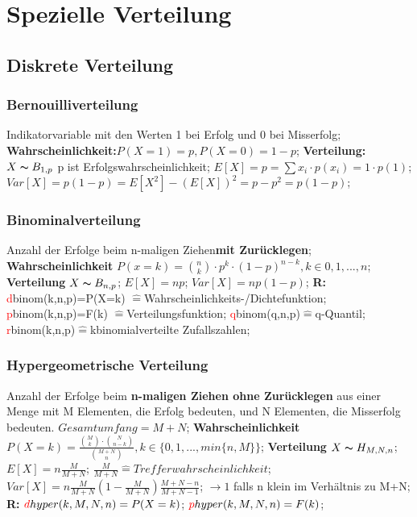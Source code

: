 \section{Spezielle Verteilung}
\subsection{Diskrete Verteilung}
\subsubsection{Bernouilliverteilung}
Indikatorvariable mit den Werten 1 bei Erfolg und 0 bei Misserfolg;
\textbf{Wahrscheinlichkeit:}$P(X=1) = p, P(X=0)  = 1 - p$; 
\textbf{Verteilung:} $X \thicksim B_{1,p}$ p ist Erfolgswahrscheinlichkeit; 
$E[X] = p = \sum x_{i} \cdot p(x_{i}) = 1 \cdot p(1)$; 
$Var[X] = p(1-p)  = E[X^2] -(E[X])^2 = p - p^2 = p(1-p)$; 
\subsubsection{Binominalverteilung}
Anzahl der Erfolge beim n-maligen Ziehen\textbf{mit Zurücklegen};
\textbf{Wahrscheinlichkeit} $ P(x = k ) =  \binom{n}{k} \cdot p^k \cdot (1-p)^{n-k}, k \in {0, 1, ..., n}$; 
\textbf{Verteilung} $ X \thicksim B_{n, p}$; 
$E[X] = np$; 
$ Var[X] = np(1-p) $; 
\textbf{R:}
\textcolor{red}{d}binom(k,n,p)=P(X=k) $\hat{=}$Wahrscheinlichkeits-/Dichtefunktion; 
\textcolor{red}{p}binom(k,n,p)=F(k) $\hat{=}$Verteilungsfunktion; 
\textcolor{red}{q}binom(q,n,p)$\hat{=}$q-Quantil; 
\textcolor{red}{r}binom(k,n,p)$\hat{=}$kbinomialverteilte Zufallszahlen; 
\subsubsection{Hypergeometrische Verteilung}
Anzahl der Erfolge beim \textbf{n-maligen Ziehen ohne Zurücklegen} aus einer Menge mit M Elementen, die Erfolg bedeuten, und N Elementen, die Misserfolg bedeuten. $Gesamtumfang = M + N$;
\textbf{Wahrscheinlichkeit}
$ P(X=k) = \frac{\binom{M}{k} \cdot \binom{N}{n-k}}{\binom{M+N}{n}}, k \in \{0, 1, ..., min\{n,M\}\}$;
\textbf{Verteilung} $ X \thicksim H_{M, N, n}$; $E[X] = n \frac{M}{M+N}$; $\frac{M}{M+N} \hat{=} Trefferwahrscheinlichkeit$; $Var[X] = n \frac{M}{M+N}( 1 - \frac{M}{M+N}) \frac{M+N-n}{M+N-1}$; $\rightarrow 1$ falls n klein im Verhältnis zu M+N;
\textbf{R:}
$\textcolor{red}{d}hyper(k,M,N,n)=P(X=k)$;
$\textcolor{red}{p}hyper(k,M,N,n)=F(k)$;
